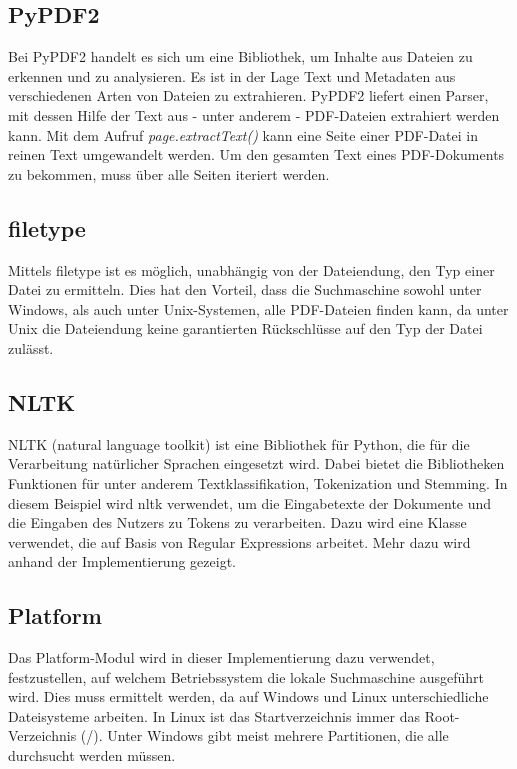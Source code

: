 \subsection*{PyPDF2}\label{apache-tika}

Bei PyPDF2 handelt es sich um eine Bibliothek, um Inhalte aus Dateien zu erkennen und zu analysieren. Es ist in der Lage Text und Metadaten aus verschiedenen Arten von Dateien zu extrahieren. PyPDF2 liefert einen Parser, mit dessen Hilfe der Text aus - unter anderem - PDF-Dateien extrahiert werden kann. Mit dem Aufruf \emph{page.extractText()} kann eine Seite einer PDF-Datei in reinen Text umgewandelt werden. Um den gesamten Text eines PDF-Dokuments zu bekommen, muss über alle Seiten iteriert werden.

\subsection*{filetype}\label{python-magic}

Mittels filetype ist es möglich, unabhängig von der Dateiendung, den Typ einer Datei zu ermitteln. Dies hat den Vorteil, dass die Suchmaschine sowohl unter Windows, als auch unter Unix-Systemen, alle PDF-Dateien finden kann, da unter Unix die Dateiendung keine garantierten Rückschlüsse auf den Typ der Datei zulässt.

\subsection*{NLTK}\label{nltk}
NLTK (natural language toolkit) ist eine Bibliothek für Python, die für die Verarbeitung natürlicher Sprachen eingesetzt wird. Dabei bietet die Bibliotheken Funktionen für unter anderem Textklassifikation, Tokenization und Stemming.
In diesem Beispiel wird nltk verwendet, um die Eingabetexte der Dokumente und die Eingaben des Nutzers zu Tokens zu verarbeiten. Dazu wird eine Klasse verwendet, die auf Basis von Regular Expressions arbeitet. Mehr dazu wird anhand der Implementierung gezeigt. %

\subsection*{Platform}
Das Platform-Modul wird in dieser Implementierung dazu verwendet, festzustellen, auf welchem Betriebssystem die lokale Suchmaschine ausgeführt wird. Dies muss ermittelt werden, da auf Windows und Linux unterschiedliche Dateisysteme arbeiten. In Linux ist das Startverzeichnis immer das Root-Verzeichnis (\glqq /\grqq). Unter Windows gibt meist mehrere Partitionen, die alle durchsucht werden müssen.


